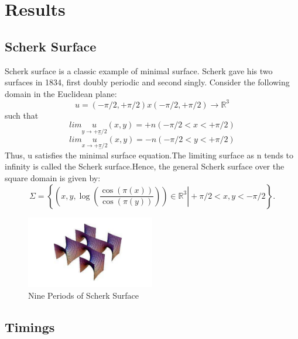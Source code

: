 \documentclass[11pt]{scrartcl}
\begin{document}
\section{Results}
\subsection{Scherk Surface}
Scherk surface is a classic example of minimal surface. Scherk gave his two surfaces in 1834, first doubly periodic and second singly. Consider the following domain in the Euclidean plane: 
 \begin{equation}
	u= {(-\pi/2,+\pi/2) x (-\pi/2,+\pi/2)} \rightarrow \mathbb{R}^{3}
\end{equation} 
such that
 \begin{equation}
	 lim \underset{y\rightarrow +\underset{-}\pi/2}  u (x, y)=  { +n  (-\pi/2< x < +\pi/2)}
\end{equation} 
 \begin{equation}
        lim  \underset{x\rightarrow +\underset{-}\pi/2}  u (x, y)=  { -n   (-\pi/2< y< +\pi/2)}
\end{equation} 
Thus, u satisfies the minimal surface equation.The limiting surface as n tends to infinity is called the Scherk surface.Hence, the general Scherk surface over the square domain is given by:
  \begin{equation}
	\Sigma = \left\{ \left. \left(x, y, \log \left( \frac{\cos (\pi(x))}{\cos (\pi(y))} \right) \right) \in \mathbb{R}^{3} \right  | +\pi/2 < x, y < -\pi/2 \right\}.
\end{equation} 

\begin{figure}
	\centering
	\includegraphics[width=0.5\textwidth]{figs/Scherk.pdf}
	\caption{Nine Periods of Scherk Surface}\label{fig:Nine Periods of Scherk Surface}
\end{figure}

\subsection{Timings}
\end{document}
